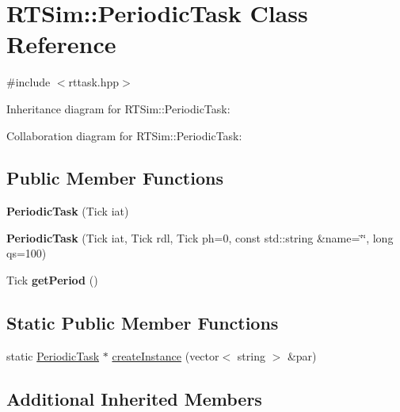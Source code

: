 \hypertarget{classRTSim_1_1PeriodicTask}{}\section{R\+T\+Sim\+:\+:Periodic\+Task Class Reference}
\label{classRTSim_1_1PeriodicTask}


{\ttfamily \#include $<$rttask.\+hpp$>$}



Inheritance diagram for R\+T\+Sim\+:\+:Periodic\+Task\+:


Collaboration diagram for R\+T\+Sim\+:\+:Periodic\+Task\+:
\subsection*{Public Member Functions}
\begin{DoxyCompactItemize}
\item 
{\bfseries Periodic\+Task} (Tick iat)\hypertarget{classRTSim_1_1PeriodicTask_ae278c3cae75594a6d71869ad2778800b}{}\label{classRTSim_1_1PeriodicTask_ae278c3cae75594a6d71869ad2778800b}

\item 
{\bfseries Periodic\+Task} (Tick iat, Tick rdl, Tick ph=0, const std\+::string \&name=\char`\"{}\char`\"{}, long qs=100)\hypertarget{classRTSim_1_1PeriodicTask_abcf8dc946f78acde75a7c2ccc078f136}{}\label{classRTSim_1_1PeriodicTask_abcf8dc946f78acde75a7c2ccc078f136}

\item 
Tick {\bfseries get\+Period} ()\hypertarget{classRTSim_1_1PeriodicTask_aeb133c73161edecd31ff7c72ec4c5242}{}\label{classRTSim_1_1PeriodicTask_aeb133c73161edecd31ff7c72ec4c5242}

\end{DoxyCompactItemize}
\subsection*{Static Public Member Functions}
\begin{DoxyCompactItemize}
\item 
static \hyperlink{classRTSim_1_1PeriodicTask}{Periodic\+Task} $\ast$ \hyperlink{classRTSim_1_1PeriodicTask_a66d41fe6fde0fd3aa5b0695e35b8fa75}{create\+Instance} (vector$<$ string $>$ \&par)
\end{DoxyCompactItemize}
\subsection*{Additional Inherited Members}


